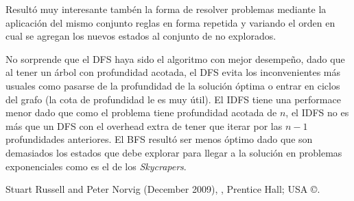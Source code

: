 \documentclass[%
    final,
    reprint,
    notitlepage,
    narroweqnarray,
    inline,
    twoside,
    invited
    ]{ieee}
\begin{document}
\par Resultó muy interesante tambén la forma de resolver problemas mediante la aplicación del mismo conjunto reglas en forma repetida y variando el orden en cual se agregan los nuevos estados al conjunto de no explorados.

\par No sorprende que el DFS haya sido el algoritmo con mejor desempeño, dado que al tener un árbol con profundidad acotada, el DFS evita los inconvenientes más usuales como pasarse de la profundidad de la solución óptima o entrar en ciclos del grafo (la cota de profundidad le es muy útil). El IDFS tiene una performace menor dado que como el problema tiene profundidad acotada de $n$, el IDFS no es más que un DFS con el overhead extra de tener que iterar por las $n-1$ profundidades anteriores. El BFS resultó ser menos óptimo dado que son demasiados los estados que debe explorar para llegar a la solución en problemas exponenciales como es el de los \textit{Skycrapers}. 

%
%
%
%
%


\begin{thebibliography}{1}

Stuart Russell and Peter Norvig (December 2009),
,
\newblock Prentice Hall; USA \copyright.







\end{thebibliography}
\end{document}
